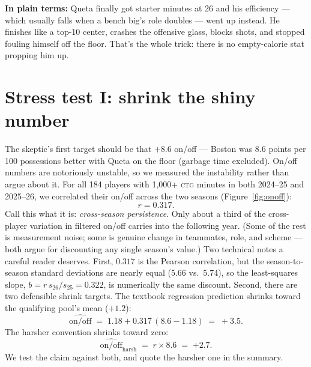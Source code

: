 \documentclass[11pt]{article}
\newcommand{\ctg}{\textsc{ctg}}
\newcommand{\plainbox}[1]{\par\medskip\noindent\begin{center}%
\colorbox{court!8}{\parbox{0.93\textwidth}{\small \textbf{\textcolor{court}{In plain terms:}} #1}}%
\end{center}\medskip}
\begin{document}
\plainbox{Queta finally got starter minutes at 26 and his efficiency --- which usually
falls when a bench big's role doubles --- went up instead. He finishes like a top-10
center, crashes the offensive glass, blocks shots, and stopped fouling himself off the
floor. That's the whole trick: there is no empty-calorie stat propping him up.}

\section{Stress test I: shrink the shiny number}
\label{sec:noise}

The skeptic's first target should be that $+8.6$ on/off --- Boston was 8.6 points per
100 possessions better with Queta on the floor (garbage time excluded). On/off numbers
are notoriously unstable, so we measured the instability rather than argue about it.
For all 184 players with 1{,}000+ \ctg{} minutes in both 2024--25 and 2025--26, we
correlated their on/off across the two seasons (Figure~\ref{fig:onoff}):
\begin{equation}
r = 0.317 .
\label{eq:r}
\end{equation}
Call this what it is: \emph{cross-season persistence}. Only about a third of the
cross-player variation in filtered on/off carries into the following year. (Some of the
rest is measurement noise; some is genuine change in teammates, role, and scheme ---
both argue for discounting any single season's value.) Two technical notes a careful
reader deserves. First, $0.317$ is the Pearson correlation, but the season-to-season
standard deviations are nearly equal (5.66 vs.\ 5.74), so the least-squares slope,
$b = r \, s_{26}/s_{25} = 0.322$, is numerically the same discount. Second, there are
two defensible shrink targets. The textbook regression prediction shrinks toward the
qualifying pool's mean ($+1.2$):
\begin{equation}
\widehat{\text{on/off}} \;=\; 1.18 + 0.317\,(8.6 - 1.18) \;=\; +3.5 .
\label{eq:shrunkreg}
\end{equation}
The harsher convention shrinks toward zero:
\begin{equation}
\widehat{\text{on/off}}_{\text{harsh}} \;=\; r \times 8.6 \;=\; \mathbf{+2.7}.
\label{eq:shrunk}
\end{equation}
We test the claim against both, and quote the harsher one in the summary.
\end{document}
